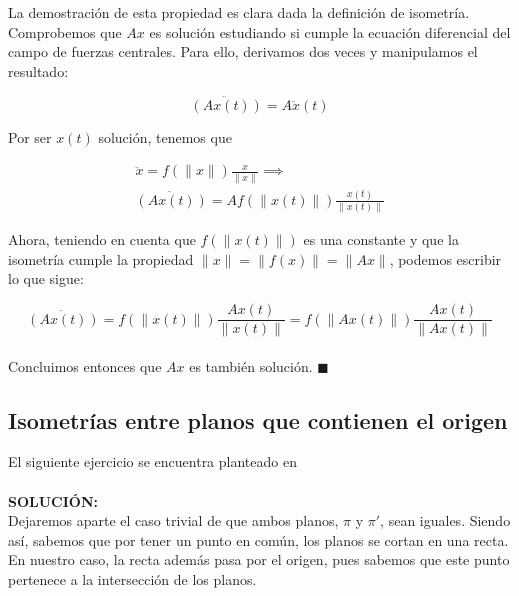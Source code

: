 \documentclass[10pt,a4paper]{article}
\theoremstyle{mystyle}
\begin{document}
La demostración de esta propiedad es clara dada la definición de isometría.\\

Comprobemos que $Ax$ es solución estudiando si cumple la ecuación diferencial del campo de fuerzas centrales. Para ello, derivamos dos veces y manipulamos el resultado:

\[
\ddot{(Ax(t))} = A\ddot{x}(t)
\]

Por ser $x(t)$ solución, tenemos que

 \begin{align*}
 \ddot{x} = f(\lVert x \rVert)\frac{x}{\lVert x \rVert} \implies \\
 \ddot{(Ax(t))} = Af(\lVert x(t) \rVert)\frac{x(t)}{\lVert x(t) \rVert}
 \end{align*}
 
Ahora, teniendo en cuenta que $f(\lVert x(t) \rVert)$ es una constante y que la isometría cumple la propiedad $\lVert x \rVert = \lVert f(x) \rVert = \lVert Ax \rVert$, podemos escribir lo que sigue:

\[
\ddot{(Ax(t))} = f(\lVert x(t) \rVert)\frac{Ax(t)}{\lVert x(t) \rVert} = f(\lVert Ax(t) \rVert)\frac{Ax(t)}{\lVert Ax(t) \rVert}
\]\\

Concluimos entonces que $Ax$ es también solución. $\blacksquare$

\subsection{Isometrías entre planos que contienen el origen}

El siguiente ejercicio se encuentra planteado en \cite{celeste}\\

\hfill\\

\textbf{SOLUCIÓN:}\\

Dejaremos aparte el caso trivial de que ambos planos, $\pi$ y $\pi '$, sean iguales. Siendo así, sabemos que por tener un punto en común, los planos se cortan en una recta. En nuestro caso, la recta además pasa por el origen, pues sabemos que este punto pertenece a la intersección de los planos.\\
\end{document}
